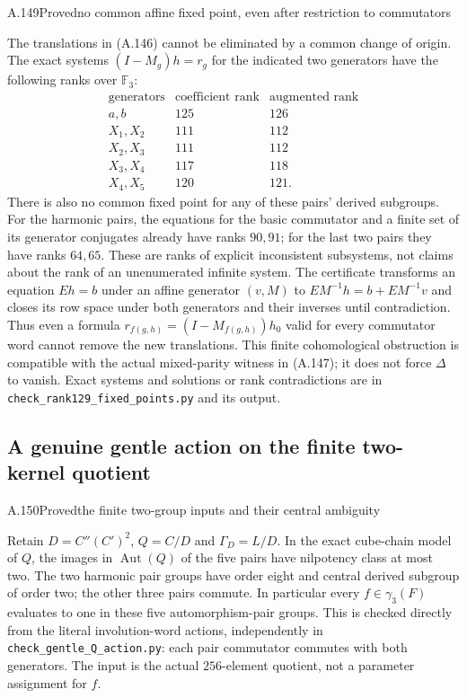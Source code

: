 \begin{statement}{A.149}{Proved}{no common affine fixed point, even after restriction to commutators}
\end{statement}
The translations in (A.146) cannot be eliminated by a common
change of origin. The exact systems
$(I-M_g)h=r_g$ for the indicated two generators have the
following ranks over $\mathbb F_3$:
\[
\begin{array}{c|c|c}
 \text{generators}&\text{coefficient rank}&\text{augmented rank}\\\hline
 a,b&125&126\\
 X_1,X_2&111&112\\
 X_2,X_3&111&112\\
 X_3,X_4&117&118\\
 X_4,X_5&120&121.
\end{array}
\]
There is also no common fixed point for any of these pairs'
derived subgroups. For the harmonic pairs, the equations for
the basic commutator and a finite set of its generator
conjugates already have ranks $90,91$; for the last two
pairs they have ranks $64,65$.
These are ranks of explicit inconsistent subsystems, not
claims about the rank of an unenumerated infinite system.
The certificate transforms an equation $Eh=b$ under an
affine generator $(v,M)$ to
$EM^{-1}h=b+EM^{-1}v$ and closes its row space under both
generators and their inverses until contradiction.
Thus even a formula $r_{f(g,h)}=(I-M_{f(g,h)})h_0$ valid
for every commutator word cannot remove the new translations.
This finite cohomological obstruction is compatible with the
actual mixed-parity witness in (A.147); it does not force
$\Delta$ to vanish. Exact systems and solutions or rank
contradictions are in
\texttt{check\_rank129\_fixed\_points.py} and its output.

\subsection{A genuine gentle action on the finite two-kernel quotient}


\begin{statement}{A.150}{Proved}{the finite two-group inputs and their central ambiguity}
\end{statement}
Retain $D=C''(C')^2$, $Q=C/D$ and $\Gamma_D=L/D$.
In the exact cube-chain model of $Q$, the images in
$\operatorname{Aut}(Q)$ of the five pairs have nilpotency
class at most two. The two harmonic pair groups have
order eight and central derived subgroup of order two;
the other three pairs commute. In particular every
$f\in\gamma_3(F)$ evaluates to one in these five
automorphism-pair groups. This is checked directly
from the literal involution-word actions, independently
in \texttt{check\_gentle\_Q\_action.py}: each pair
commutator commutes with both generators. The input
is the actual $256$-element quotient, not a parameter
assignment for $f$.

